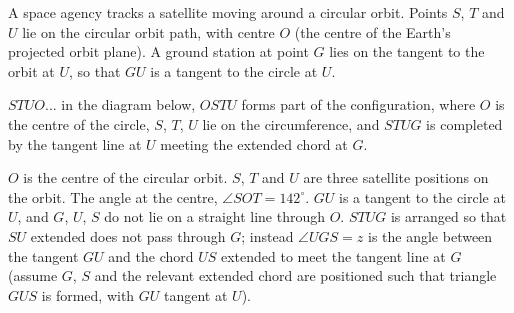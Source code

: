 \documentclass{article}
\begin{document}
\begin{preview}
\begin{question}
\noindent A space agency tracks a satellite moving around a circular orbit. Points $S$, $T$ and $U$ lie on the circular orbit path, with centre $O$ (the centre of the Earth's projected orbit plane). A ground station at point $G$ lies on the tangent to the orbit at $U$, so that $GU$ is a tangent to the circle at $U$.

$STUO$... in the diagram below, $OSTU$ forms part of the configuration, where $O$ is the centre of the circle, $S$, $T$, $U$ lie on the circumference, and $STUG$ is completed by the tangent line at $U$ meeting the extended chord at $G$.

\begin{center}
\end{center}

\noindent $O$ is the centre of the circular orbit. $S$, $T$ and $U$ are three satellite positions on the orbit. The angle at the centre, $\angle SOT = 142^\circ$. $GU$ is a tangent to the circle at $U$, and $G$, $U$, $S$ do not lie on a straight line through $O$. $STUG$ is arranged so that $SU$ extended does not pass through $G$; instead $\angle UGS = z$ is the angle between the tangent $GU$ and the chord $US$ extended to meet the tangent line at $G$ (assume $G$, $S$ and the relevant extended chord are positioned such that triangle $GUS$ is formed, with $GU$ tangent at $U$).


\end{question}
\end{preview}
\end{document}
